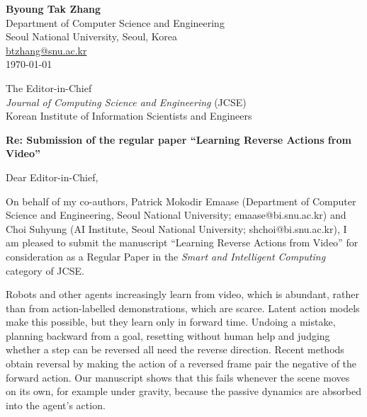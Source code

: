 \documentclass[11pt,a4paper]{article}
\begin{document}
\begin{flushright}
\textbf{Byoung Tak Zhang}\\
Department of Computer Science and Engineering\\
Seoul National University, Seoul, Korea\\
\href{mailto:btzhang@snu.ac.kr}{btzhang@snu.ac.kr}\\[4pt]
\today
\end{flushright}

The Editor-in-Chief\\
\emph{Journal of Computing Science and Engineering} (JCSE)\\
Korean Institute of Information Scientists and Engineers

\textbf{Re: Submission of the regular paper ``Learning Reverse Actions from Video''}

Dear Editor-in-Chief,

On behalf of my co-authors, Patrick Mokodir Emaase (Department of Computer Science and Engineering, Seoul National University; emaase@bi.snu.ac.kr) and Choi Suhyung (AI Institute, Seoul National University; shchoi@bi.snu.ac.kr), I am pleased to submit the manuscript ``Learning Reverse Actions from Video'' for consideration as a Regular Paper in the \emph{Smart and Intelligent Computing} category of JCSE.

Robots and other agents increasingly learn from video, which is abundant, rather than from action-labelled demonstrations, which are scarce. Latent action models make this possible, but they learn only in forward time. Undoing a mistake, planning backward from a goal, resetting without human help and judging whether a step can be reversed all need the reverse direction. Recent methods obtain reversal by making the action of a reversed frame pair the negative of the forward action. Our manuscript shows that this fails whenever the scene moves on its own, for example under gravity, because the passive dynamics are absorbed into the agent's action.
\end{document}
